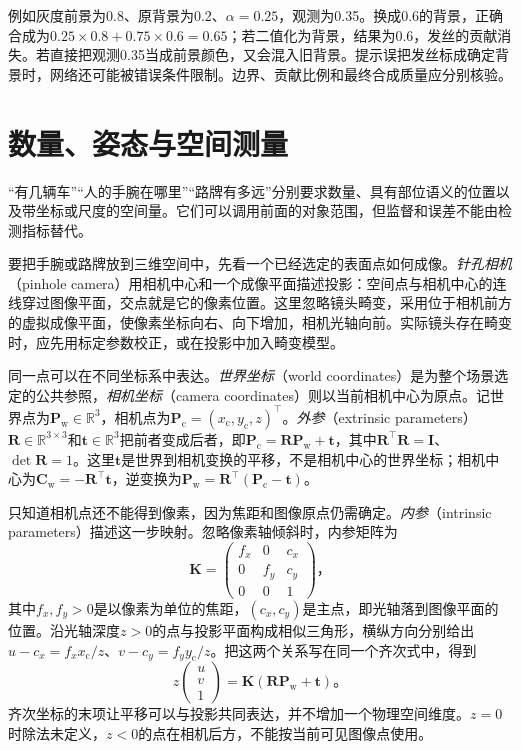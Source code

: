 例如灰度前景为0.8、原背景为0.2、$\alpha=0.25$，观测为0.35。换成0.6的背景，正确合成为$0.25\times0.8+0.75\times0.6=0.65$；若二值化为背景，结果为0.6，发丝的贡献消失。若直接把观测0.35当成前景颜色，又会混入旧背景。提示误把发丝标成确定背景时，网络还可能被错误条件限制。边界、贡献比例和最终合成质量应分别核验。

\section{数量、姿态与空间测量}
\label{sec:vision-recognition-measurement}

“有几辆车”“人的手腕在哪里”“路牌有多远”分别要求数量、具有部位语义的位置以及带坐标或尺度的空间量。它们可以调用前面的对象范围，但监督和误差不能由检测指标替代。

要把手腕或路牌放到三维空间中，先看一个已经选定的表面点如何成像。\emph{针孔相机}（pinhole camera）用相机中心和一个成像平面描述投影：空间点与相机中心的连线穿过图像平面，交点就是它的像素位置。这里忽略镜头畸变，采用位于相机前方的虚拟成像平面，使像素坐标向右、向下增加，相机光轴向前。实际镜头存在畸变时，应先用标定参数校正，或在投影中加入畸变模型。

同一点可以在不同坐标系中表达。\emph{世界坐标}（world coordinates）是为整个场景选定的公共参照，\emph{相机坐标}（camera coordinates）则以当前相机中心为原点。记世界点为$\bm{P}_{\mathrm w}\in\mathbb{R}^3$，相机点为$\bm{P}_{\mathrm c}=(x_{\mathrm c},y_{\mathrm c},z)^\top$。\emph{外参}（extrinsic parameters）$\bm{R}\in\mathbb{R}^{3\times3}$和$\bm{t}\in\mathbb{R}^3$把前者变成后者，即$\bm{P}_{\mathrm c}=\bm{R}\bm{P}_{\mathrm w}+\bm{t}$，其中$\bm{R}^{\top}\bm{R}=\bm{I}$、$\det\bm{R}=1$。这里$\bm{t}$是世界到相机变换的平移，不是相机中心的世界坐标；相机中心为$\bm{C}_{\mathrm w}=-\bm{R}^{\top}\bm{t}$，逆变换为$\bm{P}_{\mathrm w}=\bm{R}^{\top}(\bm{P}_{\mathrm c}-\bm{t})$。

只知道相机点还不能得到像素，因为焦距和图像原点仍需确定。\emph{内参}（intrinsic parameters）描述这一步映射。忽略像素轴倾斜时，内参矩阵为
\[
 \bm{K}=\begin{pmatrix}
 f_x&0&c_x\\0&f_y&c_y\\0&0&1
 \end{pmatrix}\text{，}
\]
其中$f_x,f_y>0$是以像素为单位的焦距，$(c_x,c_y)$是主点，即光轴落到图像平面的位置。沿光轴深度$z>0$的点与投影平面构成相似三角形，横纵方向分别给出$u-c_x=f_xx_{\mathrm c}/z$、$v-c_y=f_yy_{\mathrm c}/z$。把这两个关系写在同一个齐次式中，得到
\begin{equation}
 z\begin{pmatrix}u\\v\\1\end{pmatrix}
 =\bm{K}(\bm{R}\bm{P}_{\mathrm w}+\bm{t})\text{。}
 \label{eq:vision-camera-projection}
\end{equation}
齐次坐标的末项让平移可以与投影共同表达，并不增加一个物理空间维度。$z=0$时除法未定义，$z<0$的点在相机后方，不能按当前可见图像点使用。

